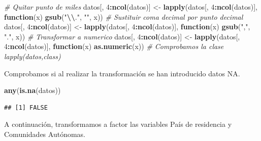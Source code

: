 \documentclass[data,article,submit,moreauthors,pdftex]{Definitions/mdpi}
\newenvironment{Shaded}{\begin{snugshade}}{\end{snugshade}}
\newcommand{\CommentTok}[1]{\textcolor[rgb]{0.56,0.35,0.01}{\textit{#1}}}
\newcommand{\ControlFlowTok}[1]{\textcolor[rgb]{0.13,0.29,0.53}{\textbf{#1}}}
\newcommand{\DecValTok}[1]{\textcolor[rgb]{0.00,0.00,0.81}{#1}}
\newcommand{\FunctionTok}[1]{\textcolor[rgb]{0.13,0.29,0.53}{\textbf{#1}}}
\newcommand{\NormalTok}[1]{#1}
\newcommand{\OtherTok}[1]{\textcolor[rgb]{0.56,0.35,0.01}{#1}}
\newcommand{\SpecialCharTok}[1]{\textcolor[rgb]{0.81,0.36,0.00}{\textbf{#1}}}
\newcommand{\StringTok}[1]{\textcolor[rgb]{0.31,0.60,0.02}{#1}}
\begin{document}
\begin{Shaded}
\begin{Highlighting}[]
\CommentTok{\# Quitar punto de miles}
\NormalTok{datos[, }\DecValTok{4}\SpecialCharTok{:}\FunctionTok{ncol}\NormalTok{(datos)] }\OtherTok{\textless{}{-}} \FunctionTok{lapply}\NormalTok{(datos[, }\DecValTok{4}\SpecialCharTok{:}\FunctionTok{ncol}\NormalTok{(datos)], }\ControlFlowTok{function}\NormalTok{(x) }\FunctionTok{gsub}\NormalTok{(}\StringTok{"}\SpecialCharTok{\textbackslash{}\textbackslash{}}\StringTok{."}\NormalTok{,}
    \StringTok{""}\NormalTok{, x))}
\CommentTok{\# Sustituir coma decimal por punto decimal}
\NormalTok{datos[, }\DecValTok{4}\SpecialCharTok{:}\FunctionTok{ncol}\NormalTok{(datos)] }\OtherTok{\textless{}{-}} \FunctionTok{lapply}\NormalTok{(datos[, }\DecValTok{4}\SpecialCharTok{:}\FunctionTok{ncol}\NormalTok{(datos)], }\ControlFlowTok{function}\NormalTok{(x) }\FunctionTok{gsub}\NormalTok{(}\StringTok{","}\NormalTok{,}
    \StringTok{"."}\NormalTok{, x))}
\CommentTok{\# Transformar a numerico}
\NormalTok{datos[, }\DecValTok{4}\SpecialCharTok{:}\FunctionTok{ncol}\NormalTok{(datos)] }\OtherTok{\textless{}{-}} \FunctionTok{lapply}\NormalTok{(datos[, }\DecValTok{4}\SpecialCharTok{:}\FunctionTok{ncol}\NormalTok{(datos)], }\ControlFlowTok{function}\NormalTok{(x) }\FunctionTok{as.numeric}\NormalTok{(x))}
\CommentTok{\# Comprobamos la clase lapply(datos,class)}
\end{Highlighting}
\end{Shaded}

Comprobamos si al realizar la transformación se han introducido datos
NA.

\begin{Shaded}
\begin{Highlighting}[]
\FunctionTok{any}\NormalTok{(}\FunctionTok{is.na}\NormalTok{(datos))}
\end{Highlighting}
\end{Shaded}

\begin{verbatim}
## [1] FALSE
\end{verbatim}

A continuación, transformamos a factor las variables País de residencia
y Comunidades Autónomas.

\begin{Shaded}
\end{Shaded}
\end{document}

